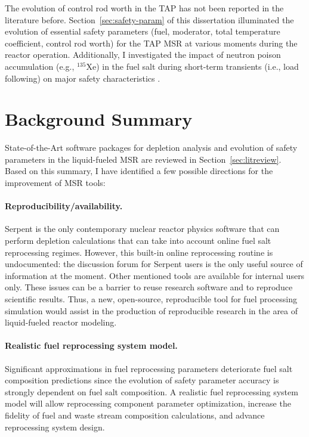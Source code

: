 The evolution of control rod worth in the \gls{TAP} has not been reported in 
the literature before. Section~\ref{sec:safety-param} of this dissertation 
illuminated the evolution of essential safety parameters (fuel, moderator, 
total temperature coefficient, control rod worth) for the \gls{TAP} \gls{MSR} 
at various moments during the reactor operation. Additionally, I investigated 
the impact of neutron poison accumulation (e.g., $^{135}$Xe) in the fuel salt 
during short-term transients (i.e., load following) on major safety 
characteristics \cite{rykhlevskii_impact_2019}.


\section{Background Summary}
State-of-the-Art software packages for depletion analysis and evolution of 
safety parameters in the liquid-fueled \gls{MSR} are reviewed in 
Section~\ref{sec:litreview}. Based on this summary, I have identified a few 
possible directions for the improvement of \gls{MSR} tools:
\paragraph*{Reproducibility/availability.}
Serpent is the only contemporary nuclear reactor physics software that can 
perform depletion calculations that can take into account online fuel salt 
reprocessing regimes. However, this built-in online reprocessing routine is 
undocumented: the discussion forum for Serpent users is the only useful 
source of information at the moment. Other mentioned tools are available for 
internal users only. These issues can be a barrier to reuse research software 
and to reproduce scientific results. Thus, a new, open-source, reproducible 
tool for fuel processing simulation would assist in the production of 
reproducible research in the area of liquid-fueled reactor modeling.
\paragraph*{Realistic fuel reprocessing system model.} 
Significant approximations in fuel reprocessing parameters deteriorate fuel 
salt composition predictions since the evolution of safety parameter accuracy 
is strongly dependent on fuel salt composition. A realistic fuel reprocessing 
system model will allow reprocessing component parameter optimization,  
increase the fidelity of fuel and waste stream composition calculations, and 
advance reprocessing system design.
